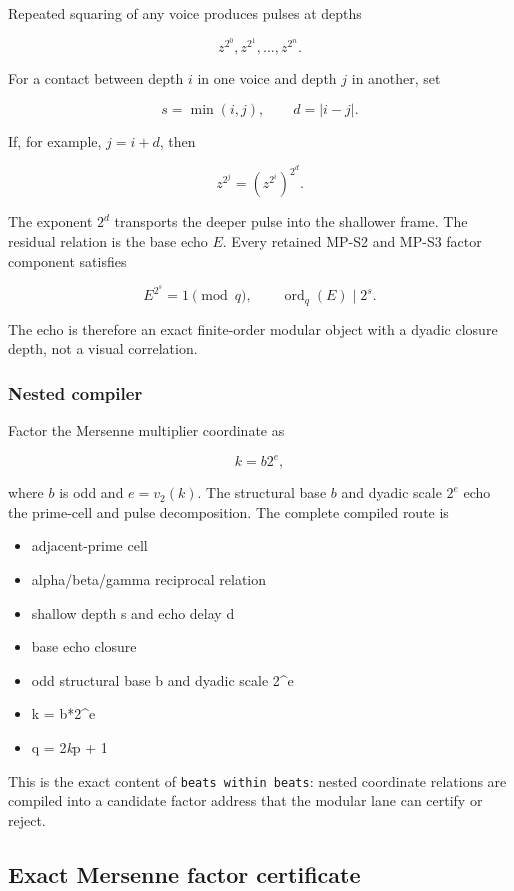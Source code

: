 Repeated squaring of any voice produces pulses at depths

\[
z^{2^0},z^{2^1},\ldots,z^{2^n}.
\]

For a contact between depth \(i\) in one voice and depth \(j\) in
another, set

\[
s=\min(i,j),
\qquad
d=|i-j|.
\]

If, for example, \(j=i+d\), then

\[
z^{2^j}=\left(z^{2^i}\right)^{2^d}.
\]

The exponent \(2^d\) transports the deeper pulse into the shallower
frame. The residual relation is the base echo \(E\). Every retained
MP-S2 and MP-S3 factor component satisfies

\[
E^{2^s}=1\pmod q,
\qquad
\operatorname{ord}_q(E)\mid2^s.
\]

The echo is therefore an exact finite-order modular object with a dyadic
closure depth, not a visual correlation.

\subsubsection{Nested compiler}\label{viii-ch10-nested-compiler}

Factor the Mersenne multiplier coordinate as

\[
k=b2^e,
\]

where \(b\) is odd and \(e=v_2(k)\). The structural base \(b\) and
dyadic scale \(2^e\) echo the prime-cell and pulse decomposition. The
complete compiled route is

\begin{itemize}
\tightlist
\item
  adjacent-prime cell
\item
  alpha/beta/gamma reciprocal relation
\item
  shallow depth s and echo delay d
\item
  base echo closure
\item
  odd structural base b and dyadic scale 2\^{}e
\item
  k = b*2\^{}e
\item
  q = 2\emph{k}p + 1
\end{itemize}

This is the exact content of \texttt{beats\ within\ beats}: nested
coordinate relations are compiled into a candidate factor address that
the modular lane can certify or reject.

\subsection{Exact Mersenne factor
certificate}\label{viii-ch10-exact-mersenne-factor-certificate}


